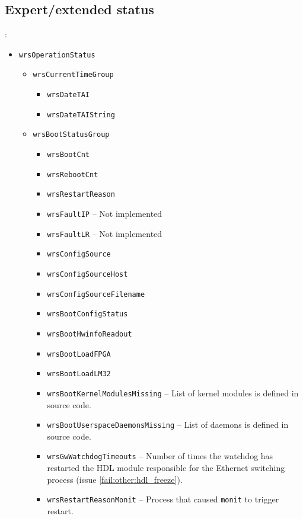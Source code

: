 \newpage
\subsection{Expert/extended status}
\label{sec:snmp_exports:expert}

:
\begin{itemize}
  \item \texttt{wrsOperationStatus}
    \begin{itemize}
      \item \texttt{wrsCurrentTimeGroup}
	\begin{itemize}
	  \item \texttt{wrsDateTAI}
	  \item \texttt{wrsDateTAIString}
	\end{itemize}
      \item \texttt{wrsBootStatusGroup}
	\begin{itemize}
	  \item \texttt{wrsBootCnt}
	  \item \texttt{wrsRebootCnt}
	  \item \texttt{wrsRestartReason}
	  \item \texttt{wrsFaultIP} -- Not implemented
	  \item \texttt{wrsFaultLR} -- Not implemented
	  \item \texttt{wrsConfigSource}
	  \item \texttt{wrsConfigSourceHost}
	  \item \texttt{wrsConfigSourceFilename}
	  \item \texttt{wrsBootConfigStatus}
	  \item \texttt{wrsBootHwinfoReadout}
	  \item \texttt{wrsBootLoadFPGA}
	  \item \texttt{wrsBootLoadLM32}
	  \item \texttt{wrsBootKernelModulesMissing} -- List of kernel modules
		is defined in source code.
	  \item \texttt{wrsBootUserspaceDaemonsMissing} -- List of daemons
		is defined in source code.
	  \item \texttt{wrsGwWatchdogTimeouts} -- Number of times the watchdog
		has restarted the HDL module responsible for the Ethernet
		switching process (issue \ref{fail:other:hdl_freeze}).
	  \item \texttt{wrsRestartReasonMonit} -- Process that caused
	        \texttt{monit} to trigger restart.
	\end{itemize}

\end{itemize}
\end{itemize}

